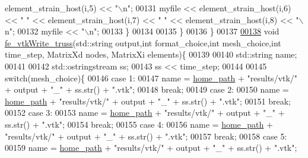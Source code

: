 \begin{DoxyCode}
      element\_strain\_host(i,5) << \textcolor{stringliteral}{"\(\backslash\)n"};
00131                 myfile << element\_strain\_host(i,6) << \textcolor{stringliteral}{" "} << element\_strain\_host(i,7) << \textcolor{stringliteral}{" "} << 
      element\_strain\_host(i,8) << \textcolor{stringliteral}{"\(\backslash\)n"};
00132                 myfile << \textcolor{stringliteral}{"\(\backslash\)n"};
00133         \}
00134 
00135     \}
00136 \}
00137 
\hyperlink{fe__vtk_8cpp_a35bde18dc6d9d842ff0bec995327d441}{00138} \textcolor{keywordtype}{void} \hyperlink{fe__vtk_8cpp_a35bde18dc6d9d842ff0bec995327d441}{fe\_vtkWrite\_truss}(std::string output,\textcolor{keywordtype}{int} format\_choice,\textcolor{keywordtype}{int} mesh\_choice,\textcolor{keywordtype}{int} time\_step,
      MatrixXd nodes, MatrixXi elements)\{
00139 
00140     std::string name;
00141 
00142     std::ostringstream ss;
00143     ss << time\_step;
00144 
00145     \textcolor{keywordflow}{switch}(mesh\_choice)\{
00146     \textcolor{keywordflow}{case} 1:
00147         name = \hyperlink{_global_variables_8h_a556ce46e457f991c51f3dac111579e2b}{home\_path} + \textcolor{stringliteral}{"results/vtk/"} + output + \textcolor{stringliteral}{"\_"} + ss.str() + \textcolor{stringliteral}{".vtk"};
00148         \textcolor{keywordflow}{break};
00149     \textcolor{keywordflow}{case} 2:
00150         name = \hyperlink{_global_variables_8h_a556ce46e457f991c51f3dac111579e2b}{home\_path} + \textcolor{stringliteral}{"results/vtk/"} + output + \textcolor{stringliteral}{"\_"} + ss.str() + \textcolor{stringliteral}{".vtk"};
00151         \textcolor{keywordflow}{break};
00152     \textcolor{keywordflow}{case} 3:
00153         name = \hyperlink{_global_variables_8h_a556ce46e457f991c51f3dac111579e2b}{home\_path} + \textcolor{stringliteral}{"results/vtk/"} + output + \textcolor{stringliteral}{"\_"} + ss.str() + \textcolor{stringliteral}{".vtk"};
00154         \textcolor{keywordflow}{break};
00155     \textcolor{keywordflow}{case} 4:
00156         name = \hyperlink{_global_variables_8h_a556ce46e457f991c51f3dac111579e2b}{home\_path} + \textcolor{stringliteral}{"results/vtk/"} + output + \textcolor{stringliteral}{"\_"} + ss.str() + \textcolor{stringliteral}{".vtk"};
00157         \textcolor{keywordflow}{break};
00158     \textcolor{keywordflow}{case} 5:
00159         name = \hyperlink{_global_variables_8h_a556ce46e457f991c51f3dac111579e2b}{home\_path} + \textcolor{stringliteral}{"results/vtk/"} + output + \textcolor{stringliteral}{"\_"} + ss.str() + \textcolor{stringliteral}{".vtk"};

\end{DoxyCode}
